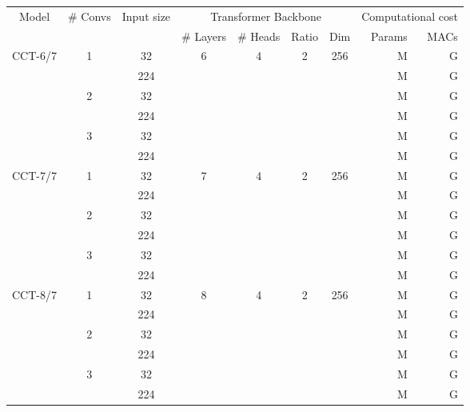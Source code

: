 \documentclass[10pt,twocolumn,letterpaper]{article}
\begin{document}
\renewcommand{\arraystretch}{1.05}
\begin{table*}[t]
    \centering
    \begin{tabular}{c|c|c|cccc|rr}
        \toprule
        \multicolumn{1}{c|}{\multirow{2}{*}{Model}} &
        \multicolumn{1}{c|}{\multirow{2}{*}{\# Convs}} &
        \multicolumn{1}{c|}{\multirow{2}{*}{Input size}} & \multicolumn{4}{c}{Transformer Backbone} & \multicolumn{2}{c}{Computational cost} \\
        &&& \# Layers & \# Heads & Ratio & Dim & Params & MACs \\
        \midrule
        \multirow{6}{*}{CCT-6/7} & \multirow{2}{*}{1} & 32 & \multirow{6}{*}{6} & \multirow{6}{*}{4} & \multirow{6}{*}{2} & \multirow{6}{*}{256} &  M &  G \\
        && 224 &&&&&  M &  G \\
        \cline{2-3}\cline{8-9}
        & \multirow{2}{*}{2} & 32 &&&&&  M &  G \\
        && 224 &&&&&  M &  G \\
        \cline{2-3}\cline{8-9}
        & \multirow{2}{*}{3} & 32 &&&&&  M &  G \\
        && 224 &&&&&  M &  G \\
        \midrule
        \multirow{6}{*}{CCT-7/7} & \multirow{2}{*}{1} & 32 & \multirow{6}{*}{7} & \multirow{6}{*}{4} & \multirow{6}{*}{2} & \multirow{6}{*}{256} &  M &  G \\
        && 224 &&&&&  M &  G \\
        \cline{2-3}\cline{8-9}
        & \multirow{2}{*}{2} & 32 &&&&&  M &  G \\
        && 224 &&&&&  M &  G \\
        \cline{2-3}\cline{8-9}
        & \multirow{2}{*}{3} & 32 &&&&&  M &  G \\
        && 224 &&&&&  M &  G \\
        \midrule
        \multirow{6}{*}{CCT-8/7} & \multirow{2}{*}{1} & 32 & \multirow{6}{*}{8} & \multirow{6}{*}{4} & \multirow{6}{*}{2} & \multirow{6}{*}{256} &  M &  G \\
        && 224 &&&&&  M &  G \\
        \cline{2-3}\cline{8-9}
        & \multirow{2}{*}{2} & 32 &&&&&  M &  G \\
        && 224 &&&&&  M &  G \\
        \cline{2-3}\cline{8-9}
        & \multirow{2}{*}{3} & 32 &&&&&  M &  G \\
        && 224 &&&&&  M &  G \\

\end{tabular}
\end{table*}
\end{document}
